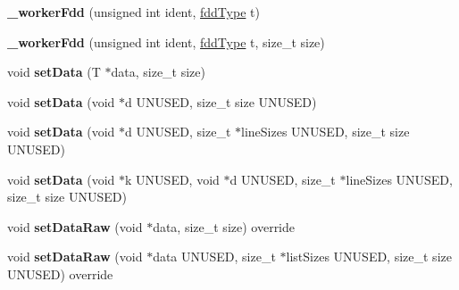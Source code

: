 \begin{DoxyCompactItemize}
\item 
\hypertarget{classfaster_1_1__workerFdd_a9f105bf8697f4f5332ccfb0fa7df8237}{}\label{classfaster_1_1__workerFdd_a9f105bf8697f4f5332ccfb0fa7df8237} 
{\bfseries \+\_\+worker\+Fdd} (unsigned int ident, \hyperlink{namespacefaster_aa8898687bc64536b60a3d5f365060cd6}{fdd\+Type} t)
\item 
\hypertarget{classfaster_1_1__workerFdd_ac8d6d1240857a56c57f5d85b6a4b67f5}{}\label{classfaster_1_1__workerFdd_ac8d6d1240857a56c57f5d85b6a4b67f5} 
{\bfseries \+\_\+worker\+Fdd} (unsigned int ident, \hyperlink{namespacefaster_aa8898687bc64536b60a3d5f365060cd6}{fdd\+Type} t, size\+\_\+t size)
\item 
\hypertarget{classfaster_1_1__workerFdd_a7031d0b585393f6e5a6ecc5e675a98ff}{}\label{classfaster_1_1__workerFdd_a7031d0b585393f6e5a6ecc5e675a98ff} 
void {\bfseries set\+Data} (T $\ast$data, size\+\_\+t size)
\item 
\hypertarget{classfaster_1_1__workerFdd_a18e7f4165cbd37d37f5759040b107cce}{}\label{classfaster_1_1__workerFdd_a18e7f4165cbd37d37f5759040b107cce} 
void {\bfseries set\+Data} (void $\ast$d U\+N\+U\+S\+ED, size\+\_\+t size U\+N\+U\+S\+ED)
\item 
\hypertarget{classfaster_1_1__workerFdd_ae2a8d9f60a3a0591f23dd5918451cecf}{}\label{classfaster_1_1__workerFdd_ae2a8d9f60a3a0591f23dd5918451cecf} 
void {\bfseries set\+Data} (void $\ast$d U\+N\+U\+S\+ED, size\+\_\+t $\ast$line\+Sizes U\+N\+U\+S\+ED, size\+\_\+t size U\+N\+U\+S\+ED)
\item 
\hypertarget{classfaster_1_1__workerFdd_a26f3dbf1187402ecd029a3ff1bf5f849}{}\label{classfaster_1_1__workerFdd_a26f3dbf1187402ecd029a3ff1bf5f849} 
void {\bfseries set\+Data} (void $\ast$k U\+N\+U\+S\+ED, void $\ast$d U\+N\+U\+S\+ED, size\+\_\+t $\ast$line\+Sizes U\+N\+U\+S\+ED, size\+\_\+t size U\+N\+U\+S\+ED)
\item 
\hypertarget{classfaster_1_1__workerFdd_a2439827c0e48411f92437a088f55b30f}{}\label{classfaster_1_1__workerFdd_a2439827c0e48411f92437a088f55b30f} 
void {\bfseries set\+Data\+Raw} (void $\ast$data, size\+\_\+t size) override
\item 
\hypertarget{classfaster_1_1__workerFdd_a236aaba89ce634bce445cfc8e00b0af1}{}\label{classfaster_1_1__workerFdd_a236aaba89ce634bce445cfc8e00b0af1} 
void {\bfseries set\+Data\+Raw} (void $\ast$data U\+N\+U\+S\+ED, size\+\_\+t $\ast$list\+Sizes U\+N\+U\+S\+ED, size\+\_\+t size U\+N\+U\+S\+ED) override
\item 

\end{DoxyCompactItemize}
